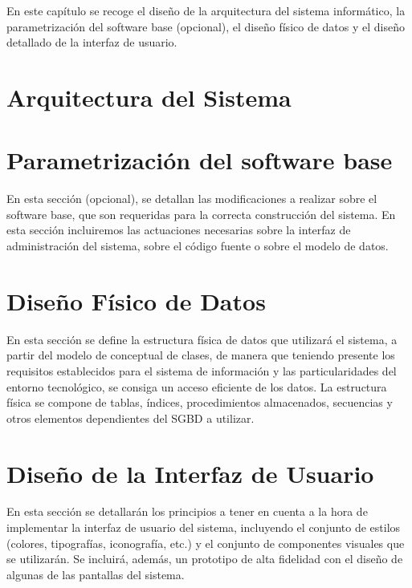En este capítulo se recoge el diseño de la arquitectura del sistema informático, la parametrización del software base (opcional), el diseño físico de datos y el diseño detallado de la interfaz de usuario.

\section{Arquitectura del Sistema}
\label{sec:SystemArchitecture}


\section{Parametrización del software base}
En esta sección (opcional), se detallan las modificaciones a realizar sobre el software base, que son requeridas para la correcta construcción del sistema. En esta sección incluiremos las  actuaciones necesarias sobre la interfaz de administración del sistema, sobre el código fuente o sobre el modelo de datos.

\section{Diseño Físico de Datos}
En esta sección se define la estructura física de datos que utilizará el sistema, a partir del modelo de conceptual de clases, de manera que teniendo presente los requisitos establecidos para el sistema de información y las particularidades del entorno tecnológico, se consiga un acceso eficiente de los datos. La estructura física se compone de tablas, índices, procedimientos almacenados, secuencias y otros elementos dependientes del SGBD a utilizar.

\section{Diseño de la Interfaz de Usuario} 
En esta sección se detallarán los principios a tener en cuenta a la hora de implementar la interfaz de usuario del sistema, incluyendo el conjunto de estilos (colores, tipografías, iconografía, etc.) y el conjunto de componentes visuales que se utilizarán. Se incluirá, además, un prototipo de alta fidelidad con el diseño de algunas de las pantallas del sistema.
